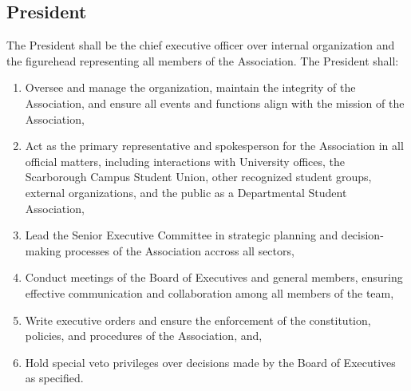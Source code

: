 \subsection{President} The President shall be the chief executive officer 
over internal organization and the figurehead representing all members
of the Association. The President shall:
\begin{enumerate}

    \item Oversee and manage the organization, maintain the 
    integrity of the Association, and ensure all events and functions
    align with the mission of the Association,

    \item Act as the primary representative and spokesperson for the
    Association in all official matters, including interactions with
    University offices, the Scarborough Campus Student Union,
    other recognized student groups, external organizations,
    and the public as a Departmental Student Association,

    \item Lead the Senior Executive Committee in strategic planning
    and decision-making processes of the Association accross all
    sectors,

    \item Conduct meetings of the Board of Executives and general 
    members, ensuring effective communication and collaboration among 
    all members of the team,

    \item Write executive orders and ensure the enforcement of the
    constitution, policies, and procedures of the Association, and,

    \item Hold special veto privileges over decisions made by the Board of
    Executives as specified.

\end{enumerate}

